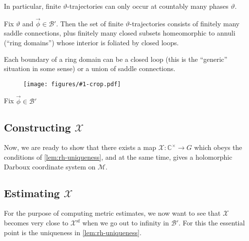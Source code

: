 \documentclass[12pt,letterpaper,reqno]{article}
\numberwithin{equation}{section}
\newcommand{\cB}{\ensuremath{\mathcal B}}
\newcommand{\cM}{\ensuremath{\mathcal M}}
\newcommand{\cX}{\ensuremath{\mathcal X}}
\newcommand{\C}{\ensuremath{\mathbb C}}
\renewcommand{\sf}{\mathrm{sf}}
\newcommand{\insfig}[2]{\begin{figure}[htbp] \centering \texttt{[image: figures/\#1-crop.pdf]} \label{fig:#1} \end{figure}}
\newcommand{\fixme}[1]{{\color{orange}{[#1]}}}
\begin{document}
In particular, finite $\vartheta$-trajectories can only 
occur at countably many phases $\vartheta$.

\begin{prop}
Fix $\vartheta$ and $\vec\phi \in \cB'$. Then
the set of finite $\vartheta$-trajectories consists 
of finitely many saddle connections, plus finitely many closed
subsets homeomorphic to annuli (``ring domains'') whose interior 
is foliated by closed loops.
\end{prop}

Each boundary of a ring domain can be a closed loop (this is the ``generic''
situation in some sense) or a union of saddle connections.

\insfig{higgs-bundles-22}{0.8}

\begin{pf} \fixme{ref Strebel?}
\end{pf}

\begin{defn}[DT invariants]
Fix $\vec\phi \in \cB'$ \fixme{...}
\end{defn}


\fixme{trajectories of quadratic differentials}

\fixme{saddle connections, closed geodesics}



\subsection{Constructing $\cX$}

Now, we are ready to show that there exists a map
$\cX: \C^\times \to G$ 
which obeys the conditions
of \autoref{lem:rh-uniqueness},
and at the same time, gives a holomorphic 
Darboux coordinate system on $\cM$.

\fixme{WKB ...}
\fixme{introduce punctured case?}


\subsection{Estimating $\cX$}

For the purpose of computing metric estimates,
we now want to see that $\cX$ becomes very close to $\cX^\sf$
when we go out to infinity in $\cB'$.
For this the essential point is the uniqueness 
in \autoref{lem:rh-uniqueness}.

\fixme{integral equations}
\fixme{like Ooguri-Vafa!}

\printbibliography
\end{document}
